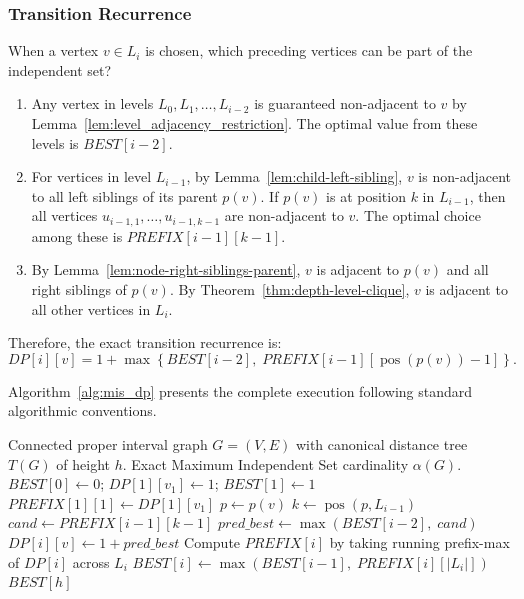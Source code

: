 \subsubsection{Transition Recurrence}
When a vertex $v \in L_i$ is chosen, which preceding vertices can be part of the independent set?
\begin{enumerate}
    \item Any vertex in levels $L_0, L_1, \dots, L_{i-2}$ is guaranteed non-adjacent to $v$ by Lemma~\ref{lem:level_adjacency_restriction}. The optimal value from these levels is $BEST[i-2]$.
    \item For vertices in level $L_{i-1}$, by Lemma~\ref{lem:child-left-sibling}, $v$ is non-adjacent to all left siblings of its parent $p(v)$. If $p(v)$ is at position $k$ in $L_{i-1}$, then all vertices $u_{i-1, 1}, \dots, u_{i-1, k-1}$ are non-adjacent to $v$. The optimal choice among these is $PREFIX[i-1][k-1]$.
    \item By Lemma~\ref{lem:node-right-siblings-parent}, $v$ is adjacent to $p(v)$ and all right siblings of $p(v)$. By Theorem~\ref{thm:depth-level-clique}, $v$ is adjacent to all other vertices in $L_i$.
\end{enumerate}

Therefore, the exact transition recurrence is:
\begin{equation}
    DP[i][v] = 1 + \max \left\{ BEST[i-2], \; PREFIX[i-1][\operatorname{pos}(p(v)) - 1] \right\}.
    \label{eq:mis_recurrence}
\end{equation}

Algorithm~\ref{alg:mis_dp} presents the complete execution following standard algorithmic conventions.

\begin{algorithm}[htbp]
\caption{\textsc{Exact-MIS-DP}$(G, T)$}
\label{alg:mis_dp}
\begin{algorithmic}[1]
\Require Connected proper interval graph $G = (V, E)$ with canonical distance tree $T(G)$ of height $h$.
\Ensure Exact Maximum Independent Set cardinality $\alpha(G)$.
\State $BEST[0] \leftarrow 0$; \quad $DP[1][v_1] \leftarrow 1$; \quad $BEST[1] \leftarrow 1$ 
\State $PREFIX[1][1] \leftarrow DP[1][v_1]$ 
        \State $p \leftarrow p(v)$ 
        \State $k \leftarrow \operatorname{pos}(p, L_{i-1})$ 
        \State $\textit{cand} \leftarrow PREFIX[i-1][k-1]$ 
        \State $\textit{pred\_best} \leftarrow \max(BEST[i-2], \; \textit{cand})$ 
        \State $DP[i][v] \leftarrow 1 + \textit{pred\_best}$
    \EndFor
    \State Compute $PREFIX[i]$ by taking running prefix-max of $DP[i]$ across $L_i$
    \State $BEST[i] \leftarrow \max(BEST[i-1], \; PREFIX[i][|L_i|])$
\EndFor
\State \Return $BEST[h]$
\end{algorithmic}
\end{algorithm}

